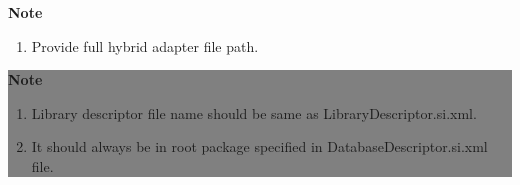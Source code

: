 \begin{enumerate}
\begin{center}
{{						\hfill \textbf{Note} \\

						\hfill 

						\begin{enumerate}

							\item \small Provide full hybrid adapter file path.
	
						\end{enumerate}

						\vspace*{0.0cm} %
					}
			}

			\end{center}


			


\end{enumerate}

	\begin{center}
		\colorbox{grey}{
			\parbox[t]{.8\linewidth}{
				\fontsize{11pt}{11pt}\selectfont %
				\vspace*{0.1cm} %
		
				\hfill \textbf{Note} \\

				\hfill 

				\begin{enumerate}

					\item \small Library descriptor file name should be same as LibraryDescriptor.si.xml.

					\item \small It should always be in root package specified in DatabaseDescriptor.si.xml file.
	
				\end{enumerate}

				\vspace*{0.0cm} %
			}
		}

\end{center}



